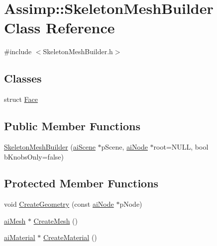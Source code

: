 \hypertarget{class_assimp_1_1_skeleton_mesh_builder}{\section{Assimp\+:\+:Skeleton\+Mesh\+Builder Class Reference}
\label{class_assimp_1_1_skeleton_mesh_builder}
}


{\ttfamily \#include $<$Skeleton\+Mesh\+Builder.\+h$>$}

\subsection*{Classes}
\begin{DoxyCompactItemize}
\item 
struct \hyperlink{struct_assimp_1_1_skeleton_mesh_builder_1_1_face}{Face}
\end{DoxyCompactItemize}
\subsection*{Public Member Functions}
\begin{DoxyCompactItemize}
\item 
\hyperlink{class_assimp_1_1_skeleton_mesh_builder_a4c96ce8815281a4f1acac88f439d5f04}{Skeleton\+Mesh\+Builder} (\hyperlink{structai_scene}{ai\+Scene} $\ast$p\+Scene, \hyperlink{structai_node}{ai\+Node} $\ast$root=N\+U\+L\+L, bool b\+Knobs\+Only=false)
\end{DoxyCompactItemize}
\subsection*{Protected Member Functions}
\begin{DoxyCompactItemize}
\item 
void \hyperlink{class_assimp_1_1_skeleton_mesh_builder_a56c8aa7c4ca19bc8000bbcd6617ec28a}{Create\+Geometry} (const \hyperlink{structai_node}{ai\+Node} $\ast$p\+Node)
\item 
\hyperlink{structai_mesh}{ai\+Mesh} $\ast$ \hyperlink{class_assimp_1_1_skeleton_mesh_builder_ad55cafc62c1de126d781730ff07f03f9}{Create\+Mesh} ()
\item 
\hyperlink{classai_material}{ai\+Material} $\ast$ \hyperlink{class_assimp_1_1_skeleton_mesh_builder_ab12f87065f7a0c18dd5bd23d5836ba62}{Create\+Material} ()
\end{DoxyCompactItemize}
